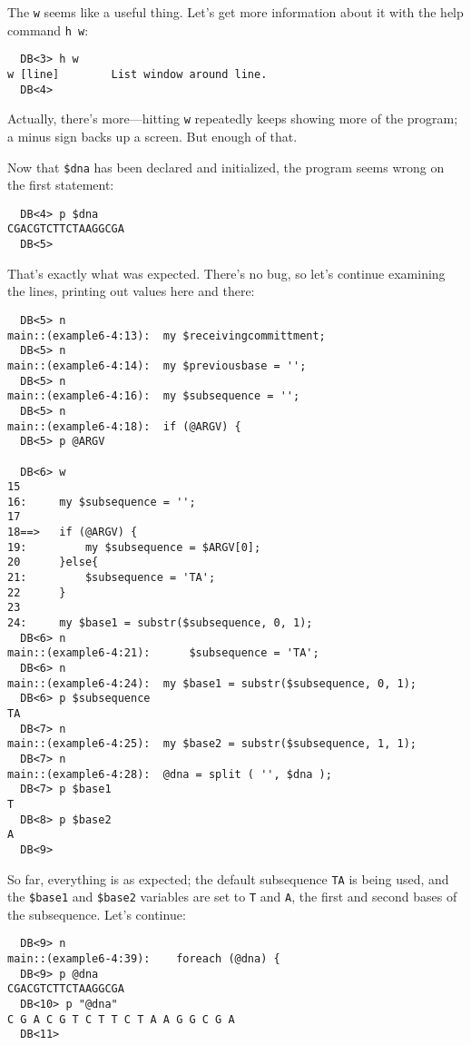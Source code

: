 The \verb|w| seems like a useful thing. Let's get more information about it with the help command \verb|h w|: 

\begin{lstlisting}
  DB<3> h w
w [line]        List window around line.
  DB<4> 
\end{lstlisting}

Actually, there's more—hitting \verb|w| repeatedly keeps showing more of the program; a minus sign backs up a screen. But enough of that.

Now that \verb|$dna| has been declared and initialized, the program seems wrong on the first statement: 

\begin{lstlisting}
  DB<4> p $dna
CGACGTCTTCTAAGGCGA
  DB<5> 
\end{lstlisting}

That's exactly what was expected. There's no bug, so let's continue examining the lines, printing out values here and there: 

\begin{lstlisting}
  DB<5> n
main::(example6-4:13):	my $receivingcommittment;
  DB<5> n
main::(example6-4:14):	my $previousbase = ''; 
  DB<5> n
main::(example6-4:16):	my $subsequence = '';
  DB<5> n
main::(example6-4:18):	if (@ARGV) {
  DB<5> p @ARGV

  DB<6> w
15
16:     my $subsequence = '';
17
18==>   if (@ARGV) {
19:         my $subsequence = $ARGV[0];
20      }else{
21:         $subsequence = 'TA';
22      }
23
24:     my $base1 = substr($subsequence, 0, 1);
  DB<6> n
main::(example6-4:21):	    $subsequence = 'TA';
  DB<6> n
main::(example6-4:24):	my $base1 = substr($subsequence, 0, 1);
  DB<6> p $subsequence
TA
  DB<7> n
main::(example6-4:25):	my $base2 = substr($subsequence, 1, 1);
  DB<7> n
main::(example6-4:28):	@dna = split ( '', $dna );
  DB<7> p $base1
T
  DB<8> p $base2
A
  DB<9>
\end{lstlisting}

So far, everything is as expected; the default subsequence \verb|TA| is being used, and the \verb|$base1| and \verb|$base2| variables are set to \verb|T| and \verb|A|, the first and second bases of the subsequence. Let's continue:

\begin{lstlisting}
  DB<9> n
main::(example6-4:39):    foreach (@dna) {
  DB<9> p @dna
CGACGTCTTCTAAGGCGA
  DB<10> p "@dna"
C G A C G T C T T C T A A G G C G A
  DB<11> 
\end{lstlisting}

